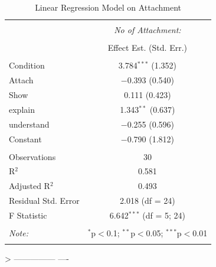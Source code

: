 \documentclass{sigchi}
\begin{document}
\begin{table}[!htbp] \centering 
  \caption{Linear Regression Model on Attachment} 
  \label{} 
\begin{tabular}{@{\extracolsep{5pt}}lc} 
\\[-1.8ex]\hline 
\hline \\[-1.8ex] 
 & \multicolumn{1}{c}{\textit{No of Attachment:}} \\ 
\cline{2-2} 
\\[-1.8ex] & Effect Est. (Std. Err.) \\ 
\hline \\[-1.8ex] 
 Condition & 3.784$^{***}$  (1.352) \\ 

 Attach & $-$0.393  (0.540) \\ 

 Show & 0.111  (0.423) \\ 

 explain & 1.343$^{**}$  (0.637) \\ 

 understand & $-$0.255  (0.596) \\ 

 Constant & $-$0.790  (1.812) \\ 

\hline \\[-1.8ex] 
Observations & 30 \\ 
R$^{2}$ & 0.581 \\ 
Adjusted R$^{2}$ & 0.493 \\ 
Residual Std. Error & 2.018 (df = 24) \\ 
F Statistic & 6.642$^{***}$ (df = 5; 24) \\ 
\hline 
\hline \\[-1.8ex] 
\textit{Note:}  & \multicolumn{1}{r}{$^{*}$p$<$0.1; $^{**}$p$<$0.05; $^{***}$p$<$0.01} \\ 
\normalsize 
\end{tabular} 
\end{table} 
> 
---------------
----%
\end{document}
